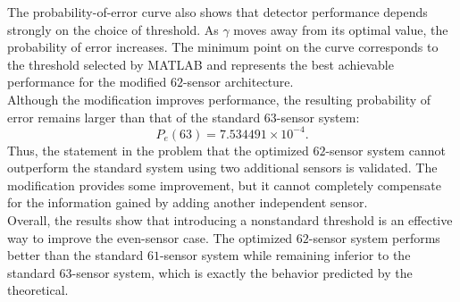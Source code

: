 \documentclass[12pt,a4paper]{article}
\begin{document}
The probability-of-error curve also shows that detector performance depends strongly on the choice of threshold. As \(\gamma\) moves away from its optimal value, the probability of error increases. The minimum point on the curve corresponds to the threshold selected by MATLAB and represents the best achievable performance for the modified \(62\)-sensor architecture.\\

Although the modification improves performance, the resulting probability of error remains larger than that of the standard \(63\)-sensor system:
\[
P_e(63)=7.534491\times10^{-4}.
\]
Thus, the statement in the problem that the optimized \(62\)-sensor system cannot outperform the standard system using two additional sensors is validated. The modification provides some improvement, but it cannot completely compensate for the information gained by adding another independent sensor.\\

Overall, the results show that introducing a nonstandard threshold is an effective way to improve the even-sensor case. The optimized \(62\)-sensor system performs better than the standard \(61\)-sensor system while remaining inferior to the standard \(63\)-sensor system, which is exactly the behavior predicted by the theoretical.
\end{document}

